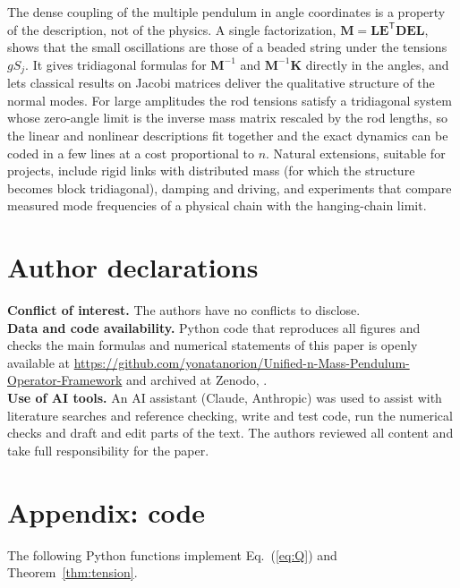 \documentclass[11pt]{article}
\newcommand{\M}{\mathbf{M}}
\newcommand{\K}{\mathbf{K}}
\newcommand{\E}{\mathbf{E}}
\newcommand{\D}{\mathbf{D}}
\newcommand{\Lm}{\mathbf{L}}
\newcommand{\T}{^{\mathsf{T}}}
\begin{document}
The dense coupling of the multiple pendulum in angle coordinates is a property of the description, not of the physics. A single factorization, $\M=\Lm\E\T\D\E\Lm$, shows that the small oscillations are those of a beaded string under the tensions $gS_j$. It gives tridiagonal formulas for $\M^{-1}$ and $\M^{-1}\K$ directly in the angles, and lets classical results on Jacobi matrices deliver the qualitative structure of the normal modes. For large amplitudes the rod tensions satisfy a tridiagonal system whose zero-angle limit is the inverse mass matrix rescaled by the rod lengths, so the linear and nonlinear descriptions fit together and the exact dynamics can be coded in a few lines at a cost proportional to $n$. Natural extensions, suitable for projects, include rigid links with distributed mass (for which the structure becomes block tridiagonal), damping and driving, and experiments that compare measured mode frequencies of a physical chain with the hanging-chain limit.

\section*{Author declarations}
\noindent\textbf{Conflict of interest.} The authors have no conflicts to disclose.\\
\textbf{Data and code availability.}
Python code that reproduces all figures and checks the main formulas and numerical statements of this paper is openly available at \url{https://github.com/yonatanorion/Unified-n-Mass-Pendulum-Operator-Framework} and archived at Zenodo, .\\
\textbf{Use of AI tools.} An AI assistant (Claude, Anthropic) was used to assist with literature searches and reference checking, write and test code, run the numerical checks and draft and edit parts of the text. The authors reviewed all content and take full responsibility for the paper.

\appendix
\section*{Appendix: code}
The following Python functions implement Eq.~(\ref{eq:Q}) and Theorem~\ref{thm:tension}.
\end{document}
